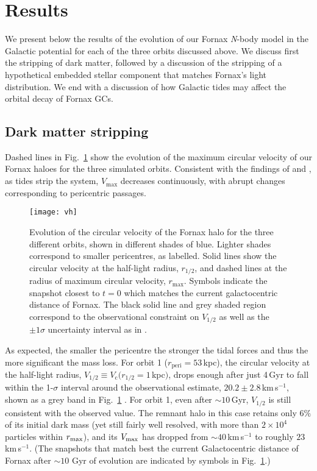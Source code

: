 \documentclass[fleqn,usenatbib]{mnras}
\begin{document}
\section{Results}
\label{sec:results}

We present below the results of the evolution of our Fornax \textit{N}-body model in the Galactic potential for each of the three orbits discussed above. We discuss first the stripping of dark matter, followed by a discussion of the stripping of a hypothetical embedded stellar component that matches Fornax's light distribution. We end with a discussion of how Galactic tides may affect the orbital decay of Fornax GCs.

\subsection{Dark matter stripping}
\label{sec:DM}

Dashed lines in Fig.~\ref{fig:vh} show the evolution of the maximum circular velocity of our Fornax haloes for the three simulated orbits. Consistent with the findings of \citet{Hayashi03} and \cite{Penarrubia08}, as tides strip the system, $V_\mathrm{max}$ decreases continuously, with abrupt changes corresponding to pericentric passages.
\begin{figure}
	\texttt{[image: vh]}
    \caption{Evolution of the circular velocity of the Fornax halo for the three different orbits, shown in different shades of blue. Lighter shades correspond to smaller pericentres, as labelled. Solid lines show the circular velocity at the half-light radius, $r_{1/2}$, and dashed lines at the radius of maximum circular velocity, $r_\mathrm{max}$. Symbols indicate the snapshot closest to $t=0$ which matches the current galactocentric distance of Fornax. The black solid line and grey shaded region correspond to the observational constraint on $V_{1/2}$ as well as the $\pm 1 \sigma$ uncertainty interval as in \citet{Fattahi2018}.}
    \label{fig:vh}
  \end{figure}
  
As expected, the smaller the pericentre the stronger the tidal forces and thus the more significant the mass loss. For orbit 1 ($r_\mathrm{peri} = 53$\,kpc), the circular velocity at the half-light radius, $V_{1/2} \equiv V_\mathrm{c}(r_{1/2}=1\,$kpc$)$, drops enough after just 4\,Gyr to fall within the 1-$\sigma$ interval around the observational estimate, $20.2 \pm 2.8$\,km\,s$^{-1}$, shown as a grey band in Fig.~\ref{fig:vh} \citep{Fattahi2016b}.  For orbit 1, even after $\sim 10$\,Gyr, $V_{1/2}$ is still consistent with the observed value. The remnant halo in this case retains only $6\%$ of its initial dark mass (yet still fairly well resolved, with more than $2\times10^4$ particles within $r_{\rm max}$), and its $V_{\rm max}$ has dropped from $\sim 40$\,km\,s$^{-1}$ to roughly $23$\,km\,s$^{-1}$. (The snapshots that match best the current Galactocentric distance of Fornax after $\sim 10$ Gyr of evolution are indicated by symbols in Fig.~\ref{fig:vh}.)
\end{document}
